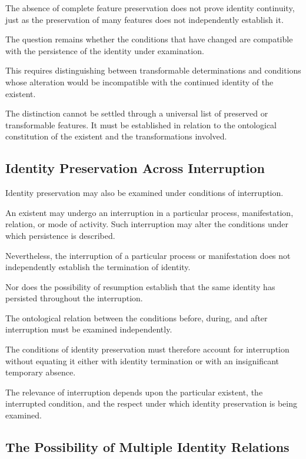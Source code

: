 The absence of complete feature preservation
does not prove identity continuity, just as
the preservation of many features does not
independently establish it.

The question remains whether the conditions
that have changed are compatible with the
persistence of the identity under examination.

This requires distinguishing between transformable
determinations and conditions whose alteration
would be incompatible with the continued identity
of the existent.

The distinction cannot be settled through
a universal list of preserved or transformable
features. It must be established in relation
to the ontological constitution of the existent
and the transformations involved.

\subsection{Identity Preservation Across Interruption}

Identity preservation may also be examined
under conditions of interruption.

An existent may undergo an interruption in
a particular process, manifestation, relation,
or mode of activity. Such interruption may
alter the conditions under which persistence
is described.

Nevertheless, the interruption of a particular
process or manifestation does not independently
establish the termination of identity.

Nor does the possibility of resumption establish
that the same identity has persisted throughout
the interruption.

The ontological relation between the conditions
before, during, and after interruption must
be examined independently.

The conditions of identity preservation must
therefore account for interruption without
equating it either with identity termination
or with an insignificant temporary absence.

The relevance of interruption depends upon
the particular existent, the interrupted
condition, and the respect under which identity
preservation is being examined.

\subsection{The Possibility of Multiple Identity Relations}

